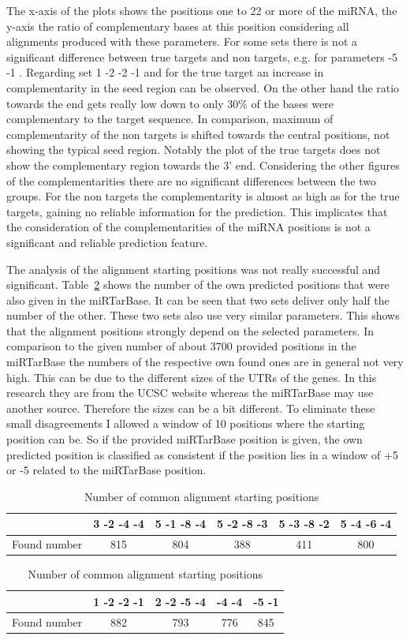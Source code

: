 \documentclass[12pt]{article}
\begin{document}
The x-axis of the plots shows the positions one to 22 or more of the miRNA, the y-axis the ratio of complementary bases at this position considering all alignments produced with these parameters. For some sets there is not a significant difference between true targets and non targets, e.g. for parameters -5 -1 . Regarding set 1 -2 -2 -1 and for the true target an increase in complementarity in the seed region can be observed. On the other hand the ratio towards the end gets really low down to only 30\% of the bases were complementary to the target sequence. In comparison, maximum of complementarity of the non targets is shifted towards the central positions, not showing the typical seed region. Notably the plot of the true targets does not show the complementary region towards the 3' end. Considering the other figures of the complementarities there are no significant differences between the two groups. For the non targets the complementarity is almost as high as for the true targets, gaining no reliable information for the prediction. This implicates that the consideration of the complementarities of the miRNA positions is not a significant and reliable prediction feature.

The analysis of the alignment starting positions was not really successful and significant. Table~\ref{tab:positions} shows the number of the own predicted positions that were also given in the miRTarBase. It can be seen that two sets deliver only half the number of the other. These two sets also use very similar parameters. This shows that the alignment positions strongly depend on the selected parameters. In comparison to the given number of about 3700 provided positions in the miRTarBase the numbers of the respective own found ones are in general not very high. This can be due to the different sizes of the UTRs of the genes. In this research they are from the UCSC website whereas the miRTarBase may use another source. Therefore the sizes can be a bit different. To eliminate these small disagreements I allowed a window of 10 positions where the starting position can be. So if the provided miRTarBase position is given, the own predicted position is classified as consistent if the position lies in a window of +5 or -5 related to the miRTarBase position. 


\begin{table}
\label{tab:positions}
\caption{Number of common alignment starting positions}
\vspace{0.3cm}
\begin{tabular}{c||c|c|c|c|c} 
& 3 -2 -4 -4 & 5 -1 -8 -4 & 5 -2 -8 -3 & 5 -3 -8 -2 & 5 -4 -6 -4  \\
\hline\hline
Found number & 815 & 804 & 388 & 411 & 800\\
\hline
\end{tabular}
\vspace{0.5cm}

\begin{tabular}{c||c|c|c|c}
& 1 -2 -2 -1 & 2 -2 -5 -4 & -4 -4 & -5 -1 \\
\hline\hline
Found number & 882 & 793 & 776 & 845  \\
\hline
\end{tabular}
\end{table}
\end{document}

